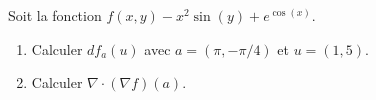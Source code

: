 
\begin{exercice}\label{exoOutilsMath-0131}

    Soit la fonction \( f(x,y)-x^2\sin(y)+ e^{\cos(x)}\).
    \begin{enumerate}
        \item
            Calculer \( df_a(u)\) avec \( a=(\pi,-\pi/4)\) et \( u=(1,5)\).
        \item
            Calculer \( \nabla\cdot(\nabla f)(a)\).
    \end{enumerate}

\end{exercice}
